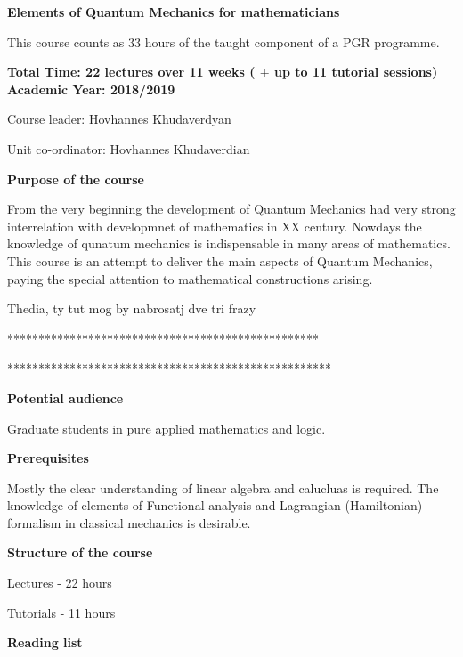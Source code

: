 \documentclass[12pt]{article}
\begin{document}
\centerline 
{\bf Elements of Quantum Mechanics for mathematicians}

\smallskip

This course counts as 33 hours of the taught component 
of a PGR programme.

{\bf Total Time: 22 lectures over 11 weeks
 ( $+$ up to 11 tutorial sessions) Academic Year: 2018/2019

Course leader: Hovhannes Khudaverdyan



Unit co-ordinator: Hovhannes Khudaverdian  



}

\medskip

{\bf Purpose of the course}

 

From the very beginning the development of
Quantum Mechanics  had very strong interrelation with
developmnet of mathematics in XX century. 
 Nowdays the knowledge of qunatum mechanics
is indispensable in many areas of mathematics.
This course is an attempt to 
deliver the main aspects of  Quantum Mechanics,
paying the special attention
to mathematical constructions arising.



 
 Thedia, ty tut mog by nabrosatj dve tri frazy

**************************************************


****************************************************


\medskip
 
{\bf Potential audience}

Graduate students in pure applied mathematics and logic.


\medskip


{\bf  Prerequisites}

Mostly the clear understanding of linear algebra 
and calucluas is required. 
The knowledge of elements of Functional analysis
 and Lagrangian (Hamiltonian) formalism in classical mechanics
is desirable.

\bigskip

{\bf Structure of the course}


Lectures - 22 hours 

Tutorials - 11 hours 

\medskip

{\bf Reading list}
\end{document}
